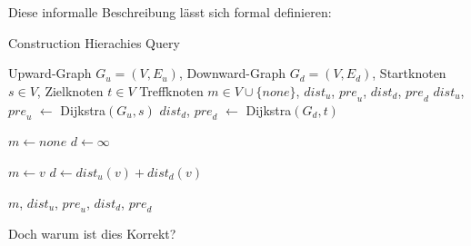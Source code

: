 Diese informalle Beschreibung lässt sich formal definieren:

\begin{algorithm}
    \caption{Construction Hierachies Query}
    \begin{algorithmic}[1]
        \Require Upward-Graph $G_u = (V, E_u)$, Downward-Graph $G_d = (V, E_d)$, Startknoten $s \in V$, Zielknoten $t \in V$
        \Ensure Treffknoten $m \in V \cup \{ {none} \}$, ${dist}_u$, ${pre}_u$, ${dist}_d$, ${pre}_d$
        \State ${dist}_u$, ${pre}_u$ $\leftarrow$ Dijkstra$(G_u, s)$
        \State ${dist}_d$, ${pre}_d$ $\leftarrow$ Dijkstra$(G_d, t)$

        \State
        \State $m \leftarrow {none}$
        \State $d \leftarrow \infty$
        \State

        \State $m \leftarrow v$
        \State $d \leftarrow {dist}_u(v) + {dist}_d(v)$
        \EndIf
        \EndFor

        \State
        \State \Return $m$, ${dist}_u$, ${pre}_u$, ${dist}_d$, ${pre}_d$
    \end{algorithmic}
    \label{ch:query_simple}
\end{algorithm}

Doch warum ist dies Korrekt?


